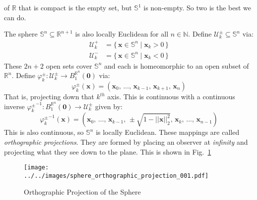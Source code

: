 \documentclass{article}
\theoremstyle{plain}
\theoremstyle{normal}
\newenvironment{example}{%
    \pushQED{\qed}\renewcommand{\qedsymbol}{$\blacksquare$}\examplex%
}{%
    \popQED\endexamplex%
}
\begin{document}
        of $\mathbb{R}$ that is compact is the empty set, but
        $\mathbb{S}^{1}$ is non-empty. So two is the best we can do.
        \begin{example}
            The sphere $\mathbb{S}^{n}\subseteq\mathbb{R}^{n+1}$ is also
            locally Euclidean for all $n\in\mathbb{N}$. Define
            $\mathcal{U}_{k}^{\pm}\subseteq\mathbb{S}^{n}$ via:
            \begin{align}
                \mathcal{U}_{k}^{+}
                &=\{\,\mathbf{x}\in\mathbb{S}^{n}\;|\;
                    \mathbf{x}_{k}>0\,\}\\
                \mathcal{U}_{k}^{-}
                &=\{\,\mathbf{x}\in\mathbb{S}^{n}\;|\;
                    \mathbf{x}_{k}<0\,\}
            \end{align}
            These $2n+2$ open sets cover $\mathbb{S}^{n}$ and each is
            homeomorphic to an open subset of $\mathbb{R}^{n}$. Define
            $\varphi_{k}^{\pm}:\mathcal{U}_{k}^{\pm}\rightarrow{B}_{1}^{\mathbb{R}^{n}}(\mathbf{0})$
            via:
            \begin{equation}
                \varphi_{k}^{\pm}(\mathbf{x})=
                (\mathbf{x}_{0},\,\dots,\,\mathbf{x}_{k-1},\,
                    \mathbf{x}_{k+1},\,\mathbf{x}_{n})
            \end{equation}
            That is, projecting down that $k^{th}$ axis. This is continuous
            with a continuous inverse
            ${\varphi_{k}^{\pm}}^{-1}:B_{1}^{\mathbb{R}^{n}}(\mathbf{0})\rightarrow\mathcal{U}_{k}^{\pm}$
            given by:
            \begin{equation}
                {\varphi_{k}^{\pm}}^{-1}(\mathbf{x})
                =(\mathbf{x}_{0},\,\dots,\,\mathbf{x}_{k-1},\,
                    \pm\sqrt{1-||\mathbf{x}||_{2}^{2}},\,\mathbf{x}_{k},\,
                    \dots,\,\mathbf{x}_{n-1})
            \end{equation}
            This is also continuous, so $\mathbb{S}^{n}$ is locally Euclidean.
        \end{example}
        These mappings are called \textit{orthographic projections}. They are
        formed by placing an observer at \textit{infinity} and projecting what
        they see down to the plane. This is shown in
        Fig.~\ref{fig:orthographic_projection_001}
        \begin{figure}
            \centering
            \texttt{[image: ../../images/sphere\_orthographic\_projection\_001.pdf]}
            \caption{Orthographic Projection of the Sphere}
            \label{fig:orthographic_projection_001}
        \end{figure}
\end{document}
